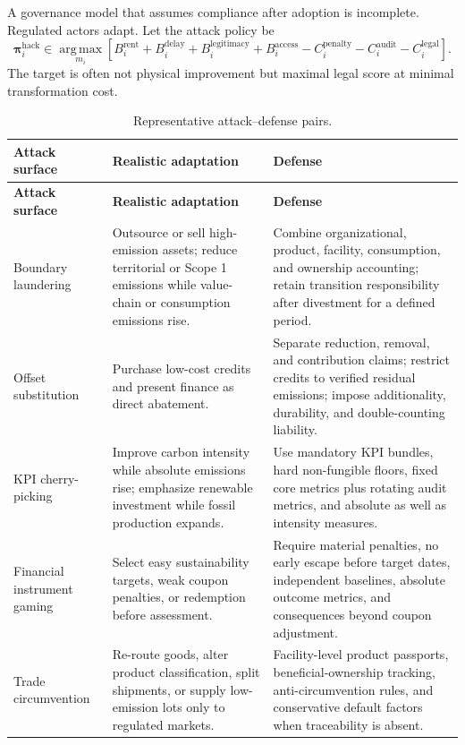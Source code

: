 \documentclass[11pt,a4paper]{article}
\numberwithin{equation}{section}
\theoremstyle{definition}
\theoremstyle{plain}
\theoremstyle{remark}
\newcommand{\argmax}{\operatorname*{arg\,max}}
\newcommand{\policy}{\boldsymbol{\pi}}
\begin{document}
A governance model that assumes compliance after adoption is incomplete. Regulated actors adapt. Let the attack policy be
\begin{equation}
\policy_i^{\mathrm{hack}}\in\argmax_{m_i}
\left[
B_i^{\mathrm{rent}}+B_i^{\mathrm{delay}}+B_i^{\mathrm{legitimacy}}
+B_i^{\mathrm{access}}
-C_i^{\mathrm{penalty}}-C_i^{\mathrm{audit}}-C_i^{\mathrm{legal}}
\right].
\label{eq:hackutility}
\end{equation}
The target is often not physical improvement but maximal legal score at minimal transformation cost.

\begin{longtable}{@{}L{0.17\textwidth}L{0.34\textwidth}L{0.41\textwidth}@{}}
\caption{Representative attack--defense pairs.}\label{tab:redteam}\\
\toprule
\textbf{Attack surface} & \textbf{Realistic adaptation} & \textbf{Defense} \\
\midrule
\endfirsthead
\toprule
\textbf{Attack surface} & \textbf{Realistic adaptation} & \textbf{Defense} \\
\midrule
\endhead
Boundary laundering & Outsource or sell high-emission assets; reduce territorial or Scope 1 emissions while value-chain or consumption emissions rise. & Combine organizational, product, facility, consumption, and ownership accounting; retain transition responsibility after divestment for a defined period. \\
\addlinespace
Offset substitution & Purchase low-cost credits and present finance as direct abatement. & Separate reduction, removal, and contribution claims; restrict credits to verified residual emissions; impose additionality, durability, and double-counting liability. \\
\addlinespace
KPI cherry-picking & Improve carbon intensity while absolute emissions rise; emphasize renewable investment while fossil production expands. & Use mandatory KPI bundles, hard non-fungible floors, fixed core metrics plus rotating audit metrics, and absolute as well as intensity measures. \\
\addlinespace
Financial instrument gaming & Select easy sustainability targets, weak coupon penalties, or redemption before assessment. & Require material penalties, no early escape before target dates, independent baselines, absolute outcome metrics, and consequences beyond coupon adjustment. \\
\addlinespace
Trade circumvention & Re-route goods, alter product classification, split shipments, or supply low-emission lots only to regulated markets. & Facility-level product passports, beneficial-ownership tracking, anti-circumvention rules, and conservative default factors when traceability is absent. \\

\end{longtable}
\end{document}

